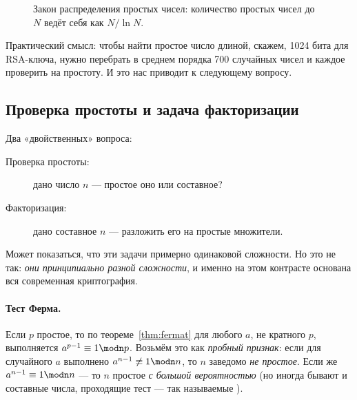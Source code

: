 \begin{figure}[H]
\centering
{}
\caption{Закон распределения простых чисел: количество простых чисел до $N$ ведёт себя как $N/\ln N$.}
\label{fig:p1-4}
\end{figure}

Практический смысл: чтобы найти простое число длиной, скажем, 1024 бита для RSA-ключа, нужно перебрать в среднем порядка 700 случайных чисел и каждое проверить на простоту. И это нас приводит к следующему вопросу.

\subsection{Проверка простоты и задача факторизации}
\label{subsec:primality}

Два «двойственных» вопроса:
\begin{description}
  \item[Проверка простоты:] дано число $n$ --- простое оно или составное?
  \item[Факторизация:] дано составное $n$ --- разложить его на простые множители.
\end{description}

Может показаться, что эти задачи примерно одинаковой сложности. Но это не так: \emph{они принципиально разной сложности}, и именно на этом контрасте основана вся современная криптография.

\paragraph*{Тест Ферма.} Если $p$ простое, то по теореме~\ref{thm:fermat} для любого $a$, не кратного $p$, выполняется $a^{p-1} \equiv 1 \modn p$. Возьмём это как \emph{пробный признак}: если для случайного $a$ выполнено $a^{n-1} \not\equiv 1 \modn n$, то $n$ заведомо \emph{не простое}. Если же $a^{n-1} \equiv 1 \modn n$ --- то $n$ простое \emph{с большой вероятностью} (но иногда бывают и составные числа, проходящие тест --- так называемые ).


